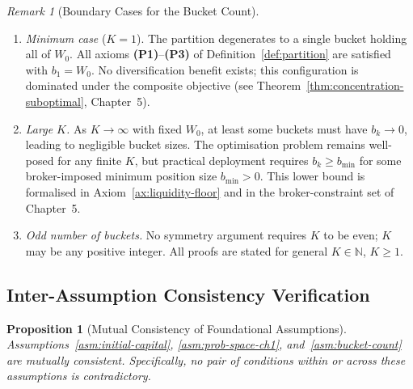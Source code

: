 \documentclass[12pt,openany]{book}
\numberwithin{equation}{chapter}
\theoremstyle{plain}
\newtheorem{proposition}[theorem]{Proposition}
\theoremstyle{definition}
\theoremstyle{remark}
\newtheorem{remark}[theorem]{Remark}
\numberwithin{equation}{chapter}
\theoremstyle{plain}
\begin{document}
\begin{remark}[Boundary Cases for the Bucket Count]
\label{rem:bucket-count-boundary}
\begin{enumerate}[label=\textbf{(R\arabic*)}]
  \item \emph{Minimum case} ($K = 1$).
        The partition degenerates to a single bucket holding all of
        $W_0$.  All axioms \textbf{(P1)}--\textbf{(P3)} of
        Definition~\ref{def:partition} are satisfied with $b_1 = W_0$.
        No diversification benefit exists; this configuration is
        dominated under the composite objective
        (see Theorem~\ref{thm:concentration-suboptimal}, Chapter~5).

  \item \emph{Large $K$.}
        As $K \to \infty$ with fixed $W_0$, at least some buckets
        must have $b_k \to 0$, leading to negligible bucket sizes.
        The optimisation problem remains well-posed for any finite
        $K$, but practical deployment requires $b_k \geq b_{\min}$
        for some broker-imposed minimum position size $b_{\min} > 0$.
        This lower bound is formalised in
        Axiom~\ref{ax:liquidity-floor} and in the broker-constraint
        set of Chapter~5.

  \item \emph{Odd number of buckets.}
        No symmetry argument requires $K$ to be even; $K$ may be any
        positive integer.  All proofs are stated for general
        $K \in \mathbb{N}$, $K \geq 1$.
\end{enumerate}
\end{remark}

\subsection{Inter-Assumption Consistency Verification}

\begin{proposition}[Mutual Consistency of Foundational Assumptions]
\label{prop:assumptions-consistent}
Assumptions~\ref{asm:initial-capital}, \ref{asm:prob-space-ch1},
and~\ref{asm:bucket-count} are mutually consistent.  Specifically,
no pair of conditions within or across these assumptions is
contradictory.
\end{proposition}
\end{document}
